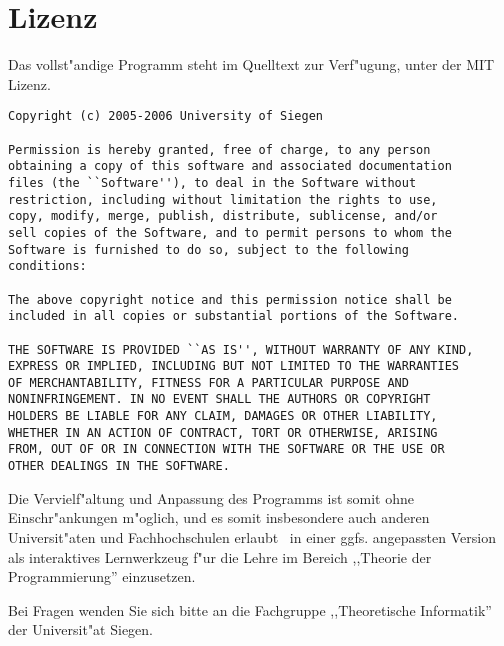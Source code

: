 
\chapter{Lizenz}

Das vollst"andige Programm steht im Quelltext zur Verf"ugung, unter der MIT Lizenz.
\begin{verbatim}
Copyright (c) 2005-2006 University of Siegen

Permission is hereby granted, free of charge, to any person
obtaining a copy of this software and associated documentation
files (the ``Software''), to deal in the Software without
restriction, including without limitation the rights to use,
copy, modify, merge, publish, distribute, sublicense, and/or
sell copies of the Software, and to permit persons to whom the
Software is furnished to do so, subject to the following
conditions:

The above copyright notice and this permission notice shall be
included in all copies or substantial portions of the Software.

THE SOFTWARE IS PROVIDED ``AS IS'', WITHOUT WARRANTY OF ANY KIND,
EXPRESS OR IMPLIED, INCLUDING BUT NOT LIMITED TO THE WARRANTIES
OF MERCHANTABILITY, FITNESS FOR A PARTICULAR PURPOSE AND
NONINFRINGEMENT. IN NO EVENT SHALL THE AUTHORS OR COPYRIGHT
HOLDERS BE LIABLE FOR ANY CLAIM, DAMAGES OR OTHER LIABILITY,
WHETHER IN AN ACTION OF CONTRACT, TORT OR OTHERWISE, ARISING
FROM, OUT OF OR IN CONNECTION WITH THE SOFTWARE OR THE USE OR
OTHER DEALINGS IN THE SOFTWARE.
\end{verbatim}
Die Vervielf"altung und Anpassung des Programms ist somit ohne Einschr"ankungen m"oglich, und es somit insbesondere
auch anderen Universit"aten und Fachhochschulen erlaubt \TPML\ in einer ggfs. angepassten Version als interaktives
Lernwerkzeug f"ur die Lehre im Bereich ,,Theorie der Programmierung'' einzusetzen.

Bei Fragen wenden Sie sich bitte an die Fachgruppe ,,Theoretische Informatik'' der Universit"at Siegen.



